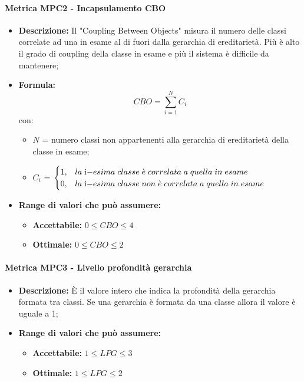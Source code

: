     \paragraph{Metrica MPC2 - Incapsulamento CBO}
    \begin{itemize}
        \item \textbf{Descrizione:} Il "Coupling Between Objects" misura il numero delle classi correlate ad una in esame al di fuori dalla gerarchia di ereditarietà. Più è alto il grado di coupling della classe in esame e più il sistema è difficile da mantenere;
        \item \textbf{Formula:} $$CBO = {\sum_{i=1}^{N} C_i}$$
        con:
        \begin{itemize}
            \item $N$ = numero classi non appartenenti alla gerarchia di ereditarietà della classe in esame;
            \item $C_i$ =
            \begin{math} {
                \begin{cases}
                    1, & la \; $i$-esima \; classe \; \grave{e} \; correlata \; a \; quella \; in \; esame \\
                    0, & la \; $i$-esima \; classe \; non \; \grave{e} \; correlata \; a \; quella \; in \; esame
                \end{cases}
            }
            \end{math}
        \end{itemize}
        \item \textbf{Range di valori che può assumere:}
        \begin{itemize}
            \item \textbf{Accettabile:} $0 \leq{} CBO \leq 4$
            \item \textbf{Ottimale:} $0 \leq{} CBO \leq 2$
        \end{itemize}
    \end{itemize}

    \paragraph{Metrica MPC3 - Livello profondità gerarchia}
    \begin{itemize}
        \item \textbf{Descrizione:} È il valore intero che indica la profondità della gerarchia formata tra classi. Se una gerarchia è formata da una classe allora il valore è uguale a 1;
        \item \textbf{Range di valori che può assumere:}
        \begin{itemize}
            \item \textbf{Accettabile:} $1 \leq{} LPG \leq 3$
            \item \textbf{Ottimale:} $1 \leq{} LPG \leq 2$
        \end{itemize}
    \end{itemize}

